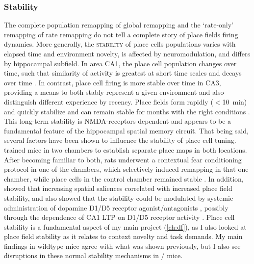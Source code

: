 \subsubsection{Stability}
\label{sec:intro:memory:stability}
The complete population remapping of global remapping and the `rate-only' remapping of rate remapping do not tell a complete story of place fields firing dynamics.
More generally, the \textsc{stability} of place cells populations varies with elapsed time and environment novelty, is affected by neuromodulation, and differs by hippocampal subfield.
In area CA1, the place cell population changes over time, such that similarity of activity is greatest at short time scales and decays over time \citep{Mankin2012}.
In contrast, place cell firing is more stable over time in CA3, providing a means to both stably represent a given environment and also distinguish different experience by recency.
Place fields form rapidly ($<$10~min) and quickly stabilize \citep{Frank2004} and can remain stable for months with the right conditions \citep{Thompson1990, Lever2002a, Ziv2013}.
This long-term stability is NMDA-receptors dependent \citep{Kentros1998} and appears to be a fundamental feature of the hippocampal spatial memory circuit.
That being said, several factors have been shown to influence the stability of place cell tuning.
\citeauthor{Moita2004} trained mice in two chambers to establish separate place maps in both locations.
After becoming familiar to both, rats underwent a contextual fear conditioning protocol in one of the chambers, which selectively induced remapping in that one chamber, while place cells in the control chamber remained stable \citep{Moita2004}.
In addition, \citeauthor{Kentros2004} showed that increasing spatial saliences correlated with increased place field stability, and also showed that the stability could be modulated by systemic administration of dopamine D1/D5 receptor agonist/antagonists \citep{Kentros2004}, possibly through the dependence of CA1 LTP on D1/D5 receptor activity \citep{Kentros1998}.
Place cell stability is a fundamental aspect of my main project (\autoref{ch:df}), as I also looked at place field stability as it relates to context novelty and task demands.
My main findings in wildtype mice agree with what was shown previously, but I also see disruptions in these normal stability mechanisms in \df/ mice.

